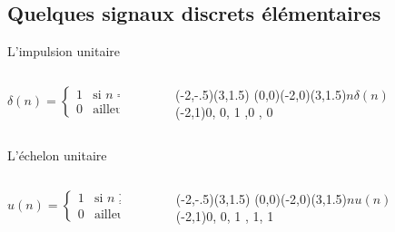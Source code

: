 \documentclass{beamer}
\begin{document}
\subsection[Signaux élémentaires]{Quelques signaux discrets élémentaires}
\begin{frame}
\begin{block}{L'impulsion unitaire}
\begin{columns}[t]
	\begin{column}{5cm}
	\smallbreak 
		\[
			\delta (n) = 
			\begin{cases}
			1 & \text{si } n = 0 \\
			0 & \text{ailleurs}
			\end{cases}
		\]
	\end{column}
	\begin{column}{5cm}
		\begin{figure}
			\begin{pspicture}[showgrid=false](-2,-.5)(3,1.5)
				\psaxeslabels{->}(0,0)(-2,0)(3,1.5){$n$}{$\delta (n)$}
				\psstem[stemhead=o, stemtag](-2,1){0, 0, 1 ,0 , 0}  
			\end{pspicture}
		\end{figure}
	\end{column}
\end{columns}
\end{block}
\pause
\begin{block}{L'échelon unitaire}
\begin{columns}[t]
	\begin{column}{5cm}
	\smallbreak 
		\[
		u(n) =
		\begin{cases}
		1 & \text{si } n \geq 0 \\
		0 & \text{ailleurs}
		\end{cases}  
		\]
	\end{column}
	\begin{column}{5cm}
		\begin{figure}
			\begin{pspicture}[showgrid=false](-2,-.5)(3,1.5)
				\psaxeslabels{->}(0,0)(-2,0)(3,1.5){$n$}{$u(n)$}
				\psstem[stemhead=o, stemtag](-2,1){0, 0, 1 , 1, 1}  
			\end{pspicture}
		\end{figure}
	\end{column}
\end{columns}
\end{block}
\end{frame}
\end{document}
